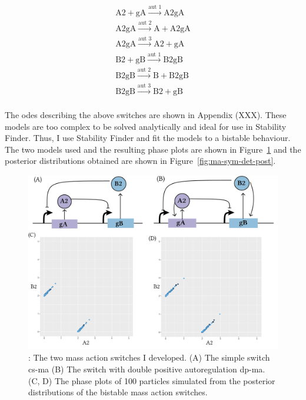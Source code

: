 $$
\begin{array}{cccc} 
    \textrm{A2} + \textrm{gA} \stackrel{\textrm{aut 1}}{\longrightarrow} \textrm{A2gA} \\
    \textrm{A2gA} \stackrel{\textrm{aut 2}}{\longrightarrow} \textrm{A} + \textrm{A2gA}\\
    \textrm{A2gA} \stackrel{\textrm{aut 3}}{\longrightarrow} \textrm{A2}+ \textrm{gA}  \\
    \textrm{B2} + \textrm{gB} \stackrel{\textrm{aut 1}}{\longrightarrow} \textrm{B2gB} \\
    \textrm{B2gB} \stackrel{\textrm{aut 2}}{\longrightarrow} \textrm{B} + \textrm{B2gB}\\
    \textrm{B2gB} \stackrel{\textrm{aut 3}}{\longrightarrow} \textrm{B2}+ \textrm{gB}  \\
\end{array}
$$

The \acrshort{ode}s describing the above switches are shown in Appendix (XXX). These models are too complex to be solved analytically and ideal for use in Stability Finder. Thus, I use Stability Finder and fit the models to a bistable behaviour. The two models used and the resulting phase plots are shown in Figure~\ref{fig:ma-cs-dp-phase} and the posterior distributions  obtained are shown in Figure~\ref{fig:ma-sym-det-post}. 

\begin{figure}[htbp]
\begin{center}
\includegraphics[scale=0.7]{../../chapters/chapterStabilityFinder/images/MA-cs-dp-phase.png}
\caption[LoF caption]{ \label{fig:ma-cs-dp-phase}: The two mass action switches I developed. (A) The simple switch \acrshort{cs-ma} (B) The switch with double positive autoregulation \acrshort{dp-ma}. (C, D) The phase plots of 100 particles simulated from the posterior distributions of the bistable mass action switches.}
\end{center}
\end{figure}


